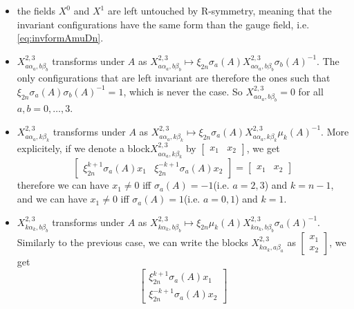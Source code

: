             \begin{itemize}
                \item the fields $X^0$ and $X^1$ are left untouched by R-symmetry, meaning that the invariant configurations have the same form than the gauge field, i.e. \eqref{eq:invformAmuDn}.
                \item $X^{2,3}_{a\alpha_a,b\beta_b}$ transforms under $A$ as $X^{2,3}_{a\alpha_a,b\beta_b}\mapsto \xi_{2n}\sigma_a(A) X^{2,3}_{a\alpha_a,b\beta_b}\sigma_b(A)^{-1}$. The only configurations that are left invariant are therefore the ones such that $ \xi_{2n}\sigma_a(A) \sigma_b(A)^{-1}=1$, which is never the case. So $X^{2,3}_{a\alpha_a,b\beta_b}=0$ for all $a,b=0,\dots,3$.
                \item $X^{2,3}_{a\alpha_a,k\beta_k}$ transforms under $A$ as $X^{2,3}_{a\alpha_a,k\beta_k}\mapsto \xi_{2n}\sigma_a(A) X^{2,3}_{a\alpha_a,k\beta_k}\mu_k(A)^{-1}$. More explicitely, if we denote a block$X^{2,3}_{a\alpha_a,k\beta_k}$ by $\begin{bmatrix} x_1 & x_2 \end{bmatrix}$, we get
                \begin{equation}
                    \begin{bmatrix}
                        \xi^{k+1}_{2n}\sigma_a(A) x_1 & \xi^{-k+1}_{2n}\sigma_a(A) x_2
                    \end{bmatrix}=
                    \begin{bmatrix}
                        x_1 & x_2
                    \end{bmatrix}
                \end{equation}
                therefore we can have $x_1\neq0$ iff $\sigma_a(A)=-1$(i.e. $a=2,3$) and $k=n-1$, and we can have $x_1\neq0$ iff $\sigma_a(A)=1$(i.e. $a=0,1$) and $k=1$.
                \item $X^{2,3}_{k\alpha_k,b\beta_b}$ transforms under $A$ as $X^{2,3}_{k\alpha_k,b\beta_b}\mapsto \xi_{2n}\mu_k(A) X^{2,3}_{k\alpha_k,b\beta_b}\sigma_a(A)^{-1}$. Similarly to the previous case, we can write the blocks $X^{2,3}_{k\alpha_k,a\beta_a}$ as $\begin{bmatrix} x_1 \\ x_2 \end{bmatrix}$, we get
                \begin{equation}
                    \begin{bmatrix}
                        \xi^{k+1}_{2n}\sigma_a(A) x_1 \\ \xi^{-k+1}_{2n}\sigma_a(A) x_2

\end{bmatrix}
\end{equation}
\end{itemize}
